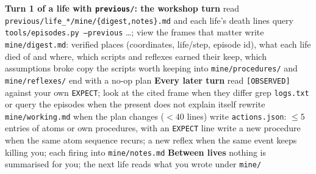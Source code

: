 \documentclass{article}
\newcommand{\file}[1]{\texttt{#1}}
\begin{document}
\begin{algorithm}[H]
\caption{What the model does with it (the contract, not harness code)}
\begin{algorithmic}[1]
\Statex \textbf{Turn 1 of a life with \file{previous/}: the workshop turn}
\State read \file{previous/life\_*/mine/\{digest,notes\}.md} and each life's death lines
\State query \file{tools/episodes.py --previous} \dots; view the frames that matter
\State write \file{mine/digest.md}: verified places (coordinates, life/step, episode id), what each life died of and where, which scripts and reflexes earned their keep, which assumptions broke
\State copy the scripts worth keeping into \file{mine/procedures/} and \file{mine/reflexes/}
\State end with a no-op plan 
\Statex \textbf{Every later turn}
\State read \texttt{[OBSERVED]} against your own \texttt{EXPECT}; look at the cited frame when they differ
\State grep \file{logs.txt} or query the episodes when the present does not explain itself
\State rewrite \file{mine/working.md} when the plan changes ($< 40$ lines)
\State write \file{actions.json}: $\le 5$ entries of atoms or own procedures, with an \texttt{EXPECT} line
\State write a new procedure when the same atom sequence recurs; a new reflex when the same event keeps killing you; each firing into \file{mine/notes.md}
\Statex \textbf{Between lives}
\State nothing is summarised for you; the next life reads what you wrote under \file{mine/}
\end{algorithmic}
\end{algorithm}
\end{document}
